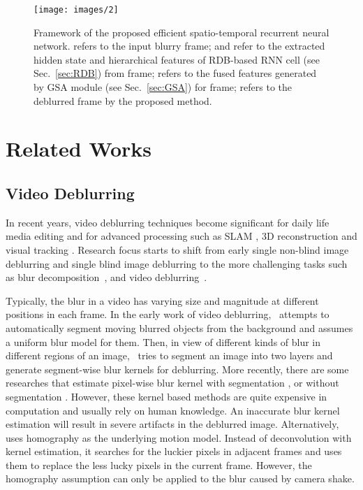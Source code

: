 \documentclass[twocolumn]{svjour3}          \smartqed  \usepackage{graphicx}
\begin{document}
\begin{figure*}[!t]
	\centering
	\texttt{[image: images/2]}
	\caption{Framework of the proposed efficient spatio-temporal recurrent neural network.  refers to the  input blurry frame;  and  refer to the extracted hidden state and hierarchical features of RDB-based RNN cell (see Sec.~\ref{sec:RDB}) from  frame;  refers to the fused features generated by GSA module (see Sec.~\ref{sec:GSA}) for  frame;  refers to the  deblurred frame by the proposed method.}
	\label{fig:process}
\end{figure*}

\section{Related Works}
\label{sec:related}
\subsection{Video Deblurring}
\label{sec:related_deblur}
In recent years, video deblurring techniques become significant for daily life media editing and for advanced processing such as SLAM \cite{lee2011simultaneous}, 3D reconstruction \cite{seok2013dense} and visual tracking \cite{wu2011blurred}. Research focus starts to shift from early single non-blind image deblurring \cite{zoran2011learning, schuler2013machine, sun2014good} and single blind image deblurring \cite{xu2010two, goldstein2012blur, michaeli2014blind, chakrabarti2016neural, nimisha2017blur} to the more challenging tasks such as blur decomposition~\cite{jin2018learning,shen2020blurry,zhong2022animation}, and video deblurring~\cite{su2017deep,wang2019edvr,nah2019recurrent,zhou2019spatio,zhong2021towards,wang2022efficient}.

Typically, the blur in a video has varying size and magnitude at different positions in each frame. In the early work of video deblurring,~\cite{bar2007variational} attempts to automatically segment moving blurred objects from the background and assumes a uniform blur model for them. Then, in view of different kinds of blur in different regions of an image,~\cite{wulff2014modeling} tries to segment an image into two layers and generate segment-wise blur kernels for deblurring. More recently, there are some researches that estimate pixel-wise blur kernel with segmentation \cite{ren2017video}, or without segmentation \cite{hyun2014segmentation}. However, these kernel based methods are quite expensive in computation and usually rely on human knowledge. An inaccurate blur kernel estimation will result in severe artifacts in the deblurred image. Alternatively,~\cite{cho2012video} uses homography as the underlying motion model. Instead of deconvolution with kernel estimation, it searches for the luckier pixels in adjacent frames and uses them to replace the less lucky pixels in the current frame. However, the homography assumption can only be applied to the blur caused by camera shake.
\end{document}
